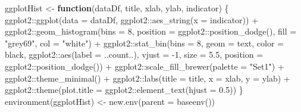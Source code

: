 \documentclass[
]{article}
\newenvironment{Shaded}{\begin{snugshade}}{\end{snugshade}}
\newcommand{\AttributeTok}[1]{\textcolor[rgb]{0.77,0.63,0.00}{#1}}
\newcommand{\ControlFlowTok}[1]{\textcolor[rgb]{0.13,0.29,0.53}{\textbf{#1}}}
\newcommand{\DecValTok}[1]{\textcolor[rgb]{0.00,0.00,0.81}{#1}}
\newcommand{\FloatTok}[1]{\textcolor[rgb]{0.00,0.00,0.81}{#1}}
\newcommand{\FunctionTok}[1]{\textcolor[rgb]{0.00,0.00,0.00}{#1}}
\newcommand{\NormalTok}[1]{#1}
\newcommand{\OtherTok}[1]{\textcolor[rgb]{0.56,0.35,0.01}{#1}}
\newcommand{\SpecialCharTok}[1]{\textcolor[rgb]{0.00,0.00,0.00}{#1}}
\newcommand{\StringTok}[1]{\textcolor[rgb]{0.31,0.60,0.02}{#1}}
\begin{document}
\begin{Shaded}
\begin{Highlighting}[]
\NormalTok{ggplotHist }\OtherTok{\textless{}{-}} \ControlFlowTok{function}\NormalTok{(dataDf, title, xlab, ylab, indicator) \{}
\NormalTok{  ggplot2}\SpecialCharTok{::}\FunctionTok{ggplot}\NormalTok{(}\AttributeTok{data =}\NormalTok{ dataDf, ggplot2}\SpecialCharTok{::}\FunctionTok{aes\_string}\NormalTok{(}\AttributeTok{x =}\NormalTok{ indicator)) }\SpecialCharTok{+} 
\NormalTok{  ggplot2}\SpecialCharTok{::}\FunctionTok{geom\_histogram}\NormalTok{(}\AttributeTok{bins =} \DecValTok{8}\NormalTok{, }\AttributeTok{position =}\NormalTok{ ggplot2}\SpecialCharTok{::}\FunctionTok{position\_dodge}\NormalTok{(), }\AttributeTok{fill =} \StringTok{"grey69"}\NormalTok{, }\AttributeTok{col =} \StringTok{"white"}\NormalTok{) }\SpecialCharTok{+}
\NormalTok{  ggplot2}\SpecialCharTok{::}\FunctionTok{stat\_bin}\NormalTok{(}\AttributeTok{bins =} \DecValTok{8}\NormalTok{, }\AttributeTok{geom =} \StringTok{\textquotesingle{}text\textquotesingle{}}\NormalTok{, }\AttributeTok{color =} \StringTok{\textquotesingle{}black\textquotesingle{}}\NormalTok{, ggplot2}\SpecialCharTok{::}\FunctionTok{aes}\NormalTok{(}\AttributeTok{label =}\NormalTok{ ..count..),}
          \AttributeTok{vjust =} \SpecialCharTok{{-}}\DecValTok{1}\NormalTok{, }\AttributeTok{size =} \FloatTok{5.5}\NormalTok{, }\AttributeTok{position =}\NormalTok{ ggplot2}\SpecialCharTok{::}\FunctionTok{position\_dodge}\NormalTok{()) }\SpecialCharTok{+}
\NormalTok{  ggplot2}\SpecialCharTok{::}\FunctionTok{scale\_fill\_brewer}\NormalTok{(}\AttributeTok{palette =} \StringTok{"Set1"}\NormalTok{) }\SpecialCharTok{+}
\NormalTok{  ggplot2}\SpecialCharTok{::}\FunctionTok{theme\_minimal}\NormalTok{() }\SpecialCharTok{+}
\NormalTok{  ggplot2}\SpecialCharTok{::}\FunctionTok{labs}\NormalTok{(}\AttributeTok{title =}\NormalTok{ title, }\AttributeTok{x =}\NormalTok{ xlab, }\AttributeTok{y =}\NormalTok{ ylab) }\SpecialCharTok{+}
\NormalTok{  ggplot2}\SpecialCharTok{::}\FunctionTok{theme}\NormalTok{(}\AttributeTok{plot.title =}\NormalTok{ ggplot2}\SpecialCharTok{::}\FunctionTok{element\_text}\NormalTok{(}\AttributeTok{hjust =} \FloatTok{0.5}\NormalTok{)) }
\NormalTok{\}}
\FunctionTok{environment}\NormalTok{(ggplotHist) }\OtherTok{\textless{}{-}} \FunctionTok{new.env}\NormalTok{(}\AttributeTok{parent =} \FunctionTok{baseenv}\NormalTok{())}


\end{Highlighting}
\end{Shaded}
\end{document}
